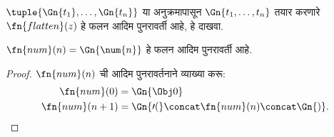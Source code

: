 \documentclass[../../../include/open-logic-section]{subfiles}
\begin{document}
\begin{prob}
$\tuple{\Gn{t_1}, \dots, \Gn{t_n}}$ या अनुक्रमापासून
$\Gn{t_1, \dots, t_n}$ तयार करणारे $\fn{flatten}(z)$ हे फलन
आदिम पुनरावर्ती आहे, हे दाखवा.
\end{prob}

\begin{prop}
  $\fn{num}(n) = \Gn{\num{n}}$ हे फलन आदिम पुनरावर्ती आहे.
\end{prop}

\begin{proof}
  $\fn{num}(n)$ ची आदिम पुनरावर्तनाने व्याख्या करू:
  \begin{align*}
    \fn{num}(0) & = \Gn{\Obj 0}\\
    \fn{num}(n+1) & = \Gn{\prime(} \concat \fn{num}(n) \concat \Gn{)}.
  \end{align*}
\end{proof}
\end{document}
